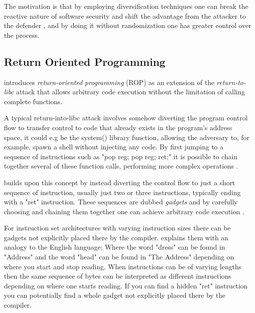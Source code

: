 The motivation is that by employing diversification techniques one can break the
reactive nature of software security and shift the advantage from the attacker to the
defender \cite{compiler-generated-sw-div}, and by doing it without randomization one has
greater control over the process.

\subsection{Return Oriented Programming}
\label{rop}

\textcite{rop} introduces \textit{return-oriented programming} (ROP) as an extension of
the \textit{return-to-libc}\cite{return-into-libc} attack that allows arbitrary code
execution without the limitation of calling complete functions.

A typical return-into-libc attack involves somehow diverting the program control
flow to transfer control to code that already exists in the program's address space,
it could e.g be the system() library function, allowing the adversary to, for example, spawn
a shell without injecting any code. By first jumping to a sequence of instructions such as
"pop reg; pop reg; ret;" it is possible to chain together several of these function calls,
performing more complex operations \cite{non-exec-stack,advanced-return-into-libc}.

\textcite{rop} builds upon this concept by instead diverting the control flow to just a short
sequence of instruction, usually just two or three instructions, typically ending with a
"ret" instruction. These sequences are dubbed \textit{gadgets} and by carefully choosing
and chaining them together one can achieve arbitrary code execution \cite{rop}.

For instruction set architectures with varying instruction sizes there can be gadgets not
explicitly placed there by the compiler. \textcite{rop} explains them with an analogy to
the English language; Where the word "dress" can be found in "Address" and the word "head"
can be found in "The Address" depending on where you start and stop reading. When
instructions can be of varying lengths then the same sequence of bytes can be interpreted
as different instructions depending on where one starts reading.  If you can find a hidden
"ret" instruction you can potentially find a whole gadget not explicitly placed there by
the compiler.
